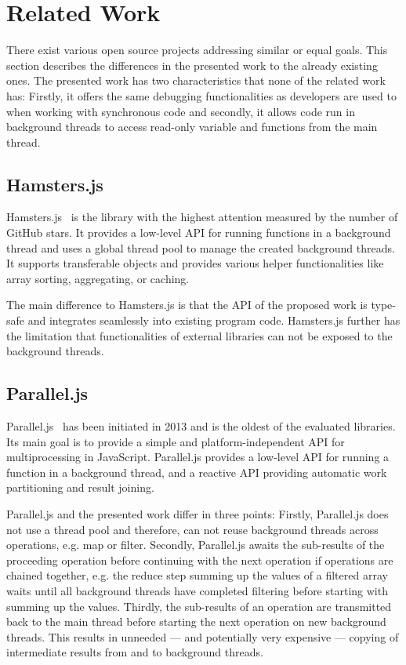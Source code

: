 \section{Related Work}\label{sec:related-work}
There exist various open source projects addressing similar or equal goals. This section describes the differences in the presented work to the already existing ones. The presented work has two characteristics that none of the related work has: Firstly, it offers the same debugging functionalities as developers are used to when working with synchronous code and secondly, it allows code run in background threads to access read-only variable and functions from the main thread.

\subsection{Hamsters.js}
Hamsters.js~\cite{hamstersjs} is the library with the highest attention measured by the number of GitHub stars. It provides a low-level API for running functions in a background thread and uses a global thread pool to manage the created background threads. It supports transferable objects and provides various helper functionalities like array sorting, aggregating, or caching.

The main difference to Hamsters.js is that the API of the proposed work is type-safe and integrates seamlessly into existing program code. Hamsters.js further has the limitation that functionalities of external libraries can not be exposed to the background threads.

\subsection{Parallel.js}
Parallel.js~\cite{SavitzkyMayr2016} has been initiated in 2013 and is the oldest of the evaluated libraries. Its main goal is to provide a simple and platform-independent API for multiprocessing in JavaScript. Parallel.js provides a low-level API for running a function in a background thread, and a reactive API providing automatic work partitioning and result joining. 

Parallel.js and the presented work differ in three points:
Firstly, Parallel.js does not use a thread pool and therefore, can not reuse background threads across operations, e.g. map or filter. Secondly, Parallel.js awaits the sub-results of the proceeding operation before continuing with the next operation if operations are chained together, e.g. the reduce step summing up the values of a filtered array waits until all background threads have completed filtering before starting with summing up the values. Thirdly, the sub-results of an operation are transmitted back to the main thread before starting the next operation on new background threads. This results in unneeded --- and potentially very expensive --- copying of intermediate results from and to background threads.


